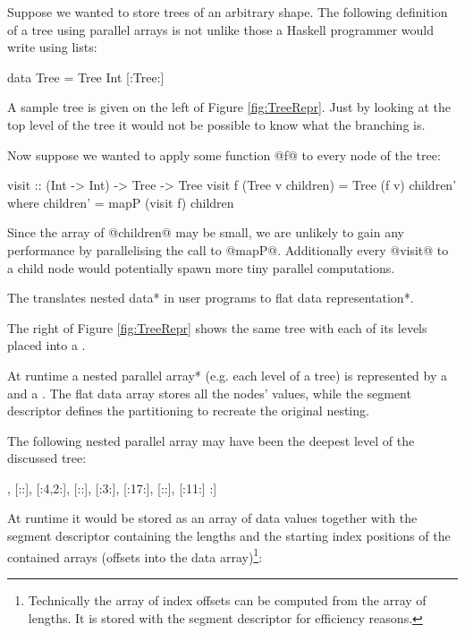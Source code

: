 \documentclass[preamble.tex]{subfiles}
\begin{document}
Suppose we wanted to store trees of an arbitrary shape. The following definition of a tree using parallel arrays is not unlike those a Haskell programmer would write using lists:

\begin{hscode}
data Tree = Tree Int [:Tree:]
\end{hscode}

A sample tree is given on the left of Figure \ref{fig:TreeRepr}. Just by looking at the top level of the tree it would not be possible to know what the branching is.

Now suppose we wanted to apply some function @f@ to every node of the tree:


\begin{hscode}
visit :: (Int -> Int) -> Tree -> Tree
visit f (Tree v children) = Tree (f v) children'
  where children' = mapP (visit f) children
\end{hscode}


Since the array of @children@ may be small, we are unlikely to gain any performance by parallelising the call to @mapP@. Additionally every @visit@ to a child node would potentially spawn more tiny parallel computations. 

\begin{bluebox}
The  translates \*nested data* in user programs to \*flat data representation*.
\end{bluebox}

The right of Figure \ref{fig:TreeRepr} shows the same tree with each of its levels placed into a .

At runtime a \*nested parallel array* (e.g. each level of a tree) is represented by a  and a \isegd{}. The flat data array stores all the nodes' values, while the segment descriptor defines the partitioning to recreate the original nesting.

The following nested parallel array may have been the deepest level of the discussed tree:

\begin{hscode}
[: [:5:], [::], [:4,2:], [::], [:3:], [:17:], [::], [:11:] :]
\end{hscode}

At runtime it would be stored as an array of data values together with the segment descriptor containing the lengths and the starting index positions of the contained arrays (offsets into the data array)\footnote{Technically the array of index offsets can be computed from the array of lengths. It is stored with the segment descriptor for efficiency reasons.}:
\end{document}
